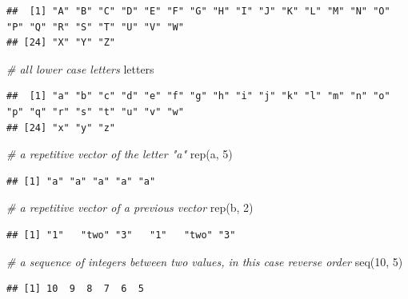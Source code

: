 \documentclass[
]{book}
\newenvironment{Shaded}{\begin{snugshade}}{\end{snugshade}}
\newcommand{\CommentTok}[1]{\textcolor[rgb]{0.56,0.35,0.01}{\textit{#1}}}
\newcommand{\DecValTok}[1]{\textcolor[rgb]{0.00,0.00,0.81}{#1}}
\newcommand{\FunctionTok}[1]{\textcolor[rgb]{0.00,0.00,0.00}{#1}}
\newcommand{\NormalTok}[1]{#1}
\newcommand{\StringTok}[1]{\textcolor[rgb]{0.31,0.60,0.02}{#1}}
\begin{document}
\begin{verbatim}
##  [1] "A" "B" "C" "D" "E" "F" "G" "H" "I" "J" "K" "L" "M" "N" "O" "P" "Q" "R" "S" "T" "U" "V" "W"
## [24] "X" "Y" "Z"
\end{verbatim}

\begin{Shaded}
\begin{Highlighting}[]
\CommentTok{\# all lower case letters}
\NormalTok{letters}
\end{Highlighting}
\end{Shaded}

\begin{verbatim}
##  [1] "a" "b" "c" "d" "e" "f" "g" "h" "i" "j" "k" "l" "m" "n" "o" "p" "q" "r" "s" "t" "u" "v" "w"
## [24] "x" "y" "z"
\end{verbatim}

\begin{Shaded}
\begin{Highlighting}[]
\CommentTok{\# a repetitive vector of the letter "a"}
\FunctionTok{rep}\NormalTok{(}\StringTok{\textquotesingle{}a\textquotesingle{}}\NormalTok{, }\DecValTok{5}\NormalTok{)}
\end{Highlighting}
\end{Shaded}

\begin{verbatim}
## [1] "a" "a" "a" "a" "a"
\end{verbatim}

\begin{Shaded}
\begin{Highlighting}[]
\CommentTok{\# a repetitive vector of a previous vector}
\FunctionTok{rep}\NormalTok{(b, }\DecValTok{2}\NormalTok{)}
\end{Highlighting}
\end{Shaded}

\begin{verbatim}
## [1] "1"   "two" "3"   "1"   "two" "3"
\end{verbatim}

\begin{Shaded}
\begin{Highlighting}[]
\CommentTok{\# a sequence of integers between two values, in this case reverse order}
\FunctionTok{seq}\NormalTok{(}\DecValTok{10}\NormalTok{, }\DecValTok{5}\NormalTok{)}
\end{Highlighting}
\end{Shaded}

\begin{verbatim}
## [1] 10  9  8  7  6  5
\end{verbatim}
\end{document}
